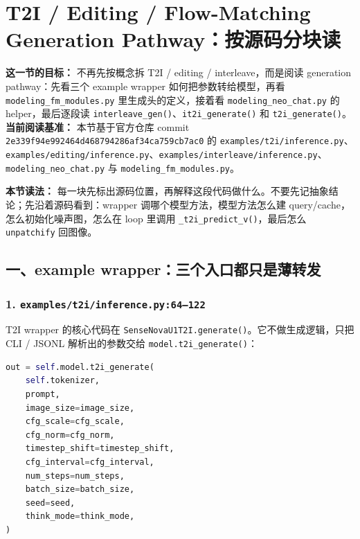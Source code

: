 
\section{T2I / Editing / Flow-Matching Generation Pathway：按源码分块读}

\begin{conceptbox}
\textbf{这一节的目标：} 不再先按概念拆 T2I / editing / interleave，而是阅读 generation pathway：先看三个 example wrapper 如何把参数转给模型，再看 \texttt{modeling\_fm\_modules.py} 里生成头的定义，接着看 \texttt{modeling\_neo\_chat.py} 的 helper，最后逐段读 \texttt{interleave\_gen()}、\texttt{it2i\_generate()} 和 \texttt{t2i\_generate()}。\\
\textbf{当前阅读基准：} 本节基于官方仓库 commit \texttt{2e339f94e992464d468794286af34ca759cb7ac0} 的 \texttt{examples/t2i/inference.py}、\texttt{examples/editing/inference.py}、\texttt{examples/interleave/inference.py}、\texttt{modeling\_neo\_chat.py} 与 \texttt{modeling\_fm\_modules.py}。
\end{conceptbox}

\begin{summarybox}
\textbf{本节读法：} 每一块先标出源码位置，再解释这段代码做什么。不要先记抽象结论；先沿着源码看到：wrapper 调哪个模型方法，模型方法怎么建 query/cache，怎么初始化噪声图，怎么在 loop 里调用 \texttt{\_t2i\_predict\_v()}，最后怎么 \texttt{unpatchify} 回图像。
\end{summarybox}

\subsection{一、example wrapper：三个入口都只是薄转发}

\subsubsection{1. \texttt{examples/t2i/inference.py:64--122}}

T2I wrapper 的核心代码在 \texttt{SenseNovaU1T2I.generate()}。它不做生成逻辑，只把 CLI / JSONL 解析出的参数交给 \texttt{model.t2i\_generate()}：

\begin{lstlisting}[language=Python]
out = self.model.t2i_generate(
    self.tokenizer,
    prompt,
    image_size=image_size,
    cfg_scale=cfg_scale,
    cfg_norm=cfg_norm,
    timestep_shift=timestep_shift,
    cfg_interval=cfg_interval,
    num_steps=num_steps,
    batch_size=batch_size,
    seed=seed,
    think_mode=think_mode,
)
\end{lstlisting}

